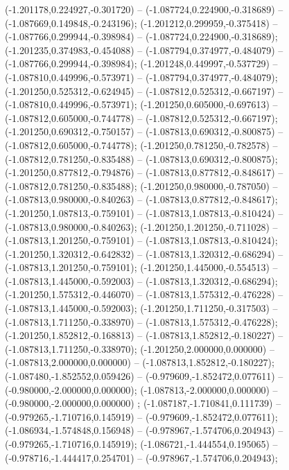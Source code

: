  (-1.201178,0.224927,-0.301720) -- (-1.087724,0.224900,-0.318689) -- (-1.087669,0.149848,-0.243196);
 (-1.201212,0.299959,-0.375418) -- (-1.087766,0.299944,-0.398984) -- (-1.087724,0.224900,-0.318689);
 (-1.201235,0.374983,-0.454088) -- (-1.087794,0.374977,-0.484079) -- (-1.087766,0.299944,-0.398984);
 (-1.201248,0.449997,-0.537729) -- (-1.087810,0.449996,-0.573971) -- (-1.087794,0.374977,-0.484079);
 (-1.201250,0.525312,-0.624945) -- (-1.087812,0.525312,-0.667197) -- (-1.087810,0.449996,-0.573971);
 (-1.201250,0.605000,-0.697613) -- (-1.087812,0.605000,-0.744778) -- (-1.087812,0.525312,-0.667197);
 (-1.201250,0.690312,-0.750157) -- (-1.087813,0.690312,-0.800875) -- (-1.087812,0.605000,-0.744778);
 (-1.201250,0.781250,-0.782578) -- (-1.087812,0.781250,-0.835488) -- (-1.087813,0.690312,-0.800875);
 (-1.201250,0.877812,-0.794876) -- (-1.087813,0.877812,-0.848617) -- (-1.087812,0.781250,-0.835488);
 (-1.201250,0.980000,-0.787050) -- (-1.087813,0.980000,-0.840263) -- (-1.087813,0.877812,-0.848617);
 (-1.201250,1.087813,-0.759101) -- (-1.087813,1.087813,-0.810424) -- (-1.087813,0.980000,-0.840263);
 (-1.201250,1.201250,-0.711028) -- (-1.087813,1.201250,-0.759101) -- (-1.087813,1.087813,-0.810424);
 (-1.201250,1.320312,-0.642832) -- (-1.087813,1.320312,-0.686294) -- (-1.087813,1.201250,-0.759101);
 (-1.201250,1.445000,-0.554513) -- (-1.087813,1.445000,-0.592003) -- (-1.087813,1.320312,-0.686294);
 (-1.201250,1.575312,-0.446070) -- (-1.087813,1.575312,-0.476228) -- (-1.087813,1.445000,-0.592003);
 (-1.201250,1.711250,-0.317503) -- (-1.087813,1.711250,-0.338970) -- (-1.087813,1.575312,-0.476228);
 (-1.201250,1.852812,-0.168813) -- (-1.087813,1.852812,-0.180227) -- (-1.087813,1.711250,-0.338970);
 (-1.201250,2.000000,0.000000) -- (-1.087813,2.000000,0.000000) -- (-1.087813,1.852812,-0.180227);
 (-1.087480,-1.852552,0.059426) -- (-0.979609,-1.852472,0.077611) -- (-0.980000,-2.000000,0.000000);
 (-1.087813,-2.000000,0.000000) -- (-0.980000,-2.000000,0.000000) ;
 (-1.087187,-1.710841,0.111739) -- (-0.979265,-1.710716,0.145919) -- (-0.979609,-1.852472,0.077611);
 (-1.086934,-1.574848,0.156948) -- (-0.978967,-1.574706,0.204943) -- (-0.979265,-1.710716,0.145919);
 (-1.086721,-1.444554,0.195065) -- (-0.978716,-1.444417,0.254701) -- (-0.978967,-1.574706,0.204943);
